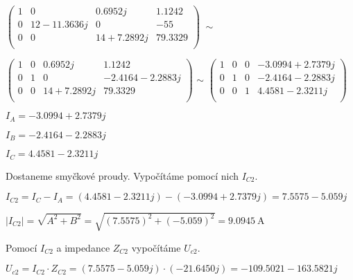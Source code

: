 \vspace{0.5cm}
$
\left(
\begin{array}{ccc|c}
    1 & 0 & 0.6952j & 1.1242\\
    0 & 12 - 11.3636j & 0 & -55\\
    0 & 0 & 14 + 7.2892j & 79.3329\\
\end{array}
\right)
\; \sim
$

\vspace{0.5cm}
$
\left(
\begin{array}{ccc|c}
    1 & 0 & 0.6952j & 1.1242\\
    0 & 1 & 0 & -2.4164 - 2.2883j\\
    0 & 0 & 14 + 7.2892j & 79.3329\\
\end{array}
\right)
$
\: \: $\sim$ \: \:
$
\left(
\begin{array}{ccc|c}
    1 & 0 & 0 & -3.0994 + 2.7379j\\
    0 & 1 & 0 & -2.4164 - 2.2883j\\
    0 & 0 & 1 & 4.4581 - 2.3211j\\
\end{array}
\right)
$

\vspace{0.5cm}
$I_A = -3.0994 + 2.7379j$

\vspace{0.25cm}
$I_B = -2.4164 - 2.2883j$

\vspace{0.25cm}
$I_C = 4.4581 - 2.3211j$

\begin{large}
\vspace{1cm} \flushleft
Dostaneme smyčkové proudy. Vypočítáme pomocí nich $I_{C2}$.
\end{large}

\vspace{0.5cm}

$I_{C2} = I_C - I_A = (4.4581 - 2.3211j) - (-3.0994 + 2.7379j) = 7.5575 - 5.059j$

\vspace{0.25cm}
$|I_{C2}| = \sqrt{A^2 + B^2} = \sqrt{(7.5575)^2 + (-5.059)^2} = 9.0945\: \si{\ampere}$

\begin{large}
\vspace{1cm} \flushleft
Pomocí $I_{C2}$ a impedance $Z_{C2}$ vypočítáme $U_{c2}$.
\end{large}

\vspace{0.5cm}
$U_{c2} = I_{C2} \cdot Z_{C2} = (7.5575 - 5.059j) \cdot (-21.6450j) = -109.5021 - 163.5821j$

